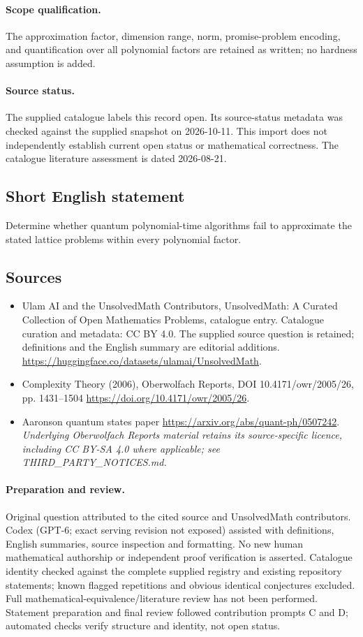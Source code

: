 \documentclass[11pt]{article}
\begin{document}
\paragraph{Scope qualification.}
The approximation factor, dimension range, norm, promise-problem encoding, and quantification over all polynomial factors are retained as written; no hardness assumption is added.
\paragraph{Source status.}
The supplied catalogue labels this record open. Its source-status metadata was checked against the supplied snapshot on 2026-10-11. This import does not independently establish current open status or mathematical correctness. The catalogue literature assessment is dated 2026-08-21.
\subsection{Short English statement}
Determine whether quantum polynomial-time algorithms fail to approximate the stated lattice problems within every polynomial factor.
\subsection{Sources}
\begin{itemize}
\item[S1] Ulam AI and the UnsolvedMath Contributors, UnsolvedMath: A Curated Collection of Open Mathematics Problems, catalogue entry. Catalogue curation and metadata: CC BY 4.0. The supplied source question is retained; definitions and the English summary are editorial additions.
\url{https://huggingface.co/datasets/ulamai/UnsolvedMath}.
\item[S2] Complexity Theory (2006), Oberwolfach Reports, DOI 10.4171/owr/2005/26, pp. 1431--1504
\url{https://doi.org/10.4171/owr/2005/26}.
\item[S3] Aaronson quantum states paper
\url{https://arxiv.org/abs/quant-ph/0507242}.
\textit{Underlying Oberwolfach Reports material retains its source-specific licence, including CC BY-SA 4.0 where applicable; see THIRD\_PARTY\_NOTICES.md.}
\end{itemize}
\paragraph{Preparation and review.}
Original question attributed to the cited source and UnsolvedMath contributors. Codex (GPT-6; exact serving revision not exposed) assisted with definitions, English summaries, source inspection and formatting. No new human mathematical authorship or independent proof verification is asserted. Catalogue identity checked against the complete supplied registry and existing repository statements; known flagged repetitions and obvious identical conjectures excluded. Full mathematical-equivalence/literature review has not been performed. Statement preparation and final review followed contribution prompts C and D; automated checks verify structure and identity, not open status.
\label{end:statement}
\end{document}
